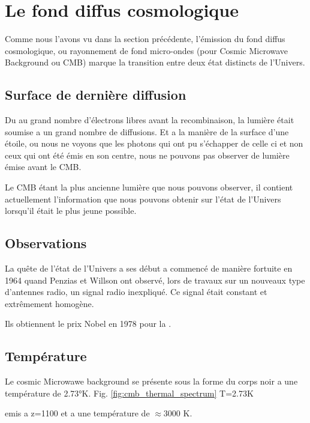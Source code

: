 \section{Le fond diffus cosmologique}
\label{sec:CMB}

Comme nous l'avons vu dans la section précédente, l’émission du fond diffus cosmologique, ou rayonnement de fond micro-ondes (pour Cosmic Microwave Background ou CMB) marque la transition entre deux état distincts de l'Univers.



\subsection{Surface de dernière diffusion}

Du au grand nombre d'électrons libres avant la recombinaison, la lumière était soumise a un grand nombre de diffusions.
Et a la manière de la surface d'une étoile, ou nous ne voyons que les photons qui ont pu s’échapper de celle ci et non ceux qui ont été émis en son centre, nous ne pouvons pas observer de lumière émise avant le CMB.

Le CMB étant la plus ancienne lumière que nous pouvons observer, il contient actuellement l'information que nous pouvons obtenir sur l'état de l'Univers lorsqu'il était le plus jeune possible.


\subsection{Observations}

La quête de l'état de l'Univers a ses début a commencé de manière fortuite en 1964 quand Penzias et Willson ont observé, lors de travaux sur un nouveaux type d’antennes radio, un signal radio inexpliqué.
Ce signal était constant et extrêmement homogène. 

Ils obtiennent le prix Nobel en 1978 pour la \cite{PenziasWilsonNobel}.


\subsection{Température}
Le cosmic Microwawe background se présente sous la forme du corps noir a une température de 2.73°K.
Fig. \ref{fig:cmb_thermal_spectrum}
T=2.73K

emis a z=1100 et a une température de $\approx 3000$ K.



